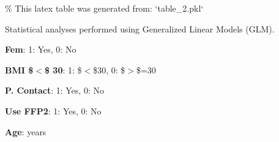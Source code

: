 \documentclass[11pt]{article}
\begin{document}
\begin{codeoutput}
\% This latex table was generated from: `table\_2.pkl`
\begin{table}[h]
\caption{Association between vaccination status and number of symptoms at reinfection}
\label{table:symptoms\_at\_reinfection}
\begin{threeparttable}
\renewcommand{\TPTminimum}{\linewidth}
\begin{tablenotes}
\footnotesize
\item Statistical analyses performed using Generalized Linear Models (GLM).
\item \textbf{Fem}: 1: Yes, 0: No
\item \textbf{BMI \$$<$\$ 30}: 1: \$$<$\$30, 0: \$$>$\$=30
\item \textbf{P. Contact}: 1: Yes, 0: No
\item \textbf{Use FFP2}: 1: Yes, 0: No
\item \textbf{Age}: years
\end{tablenotes}
\end{threeparttable}
\end{table}
\end{codeoutput}
\end{document}
